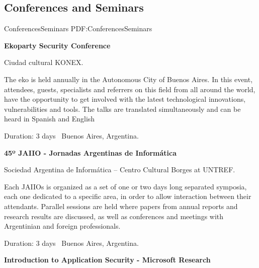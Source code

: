 \documentclass[letterpaper,MMMyyyy,nonstop]{simpleresumecv}
\begin{document}
\begin{body}

\section{Conferences\newline 
	and Seminars}
{ConferencesSeminars}
{PDF:ConferencesSeminars}


\textbf{Ekoparty Security Conference}
\hfill
{}

\BulletItem Ciudad cultural KONEX.
\begin{detail}
	\SubBulletItem
	The eko is held annually in the Autonomous City of Buenos Aires. In this event, attendees, guests, specialists and referrers on this field from all around the world, have the opportunity to get involved with the latest technological innovations, vulnerabilities and tools. The talks are translated simultaneously and can be heard in Spanish and English
\end{detail}
Duration: 3 days \SubBulletSymbol\, Buenos Aires, Argentina.

\BigGap

\textbf{45º JAIIO - Jornadas Argentinas de Informática}
\hfill
{}

\BulletItem Sociedad Argentina de Informática – Centro Cultural Borges at UNTREF.
\begin{detail}
	\SubBulletItem
	Each JAIIOs is organized as a set of one or two days long separated symposia, each one dedicated to a specific area, in order to allow interaction between their attendants. Parallel sessions are held where papers from annual reports and research results are discussed, as well as conferences and meetings with Argentinian and foreign professionals.
\end{detail}
Duration: 3 days \SubBulletSymbol\, Buenos Aires, Argentina.

\BigGap

\textbf{Introduction to Application Security - Microsoft Research}
\hfill
{}


\end{body}
\end{document}
